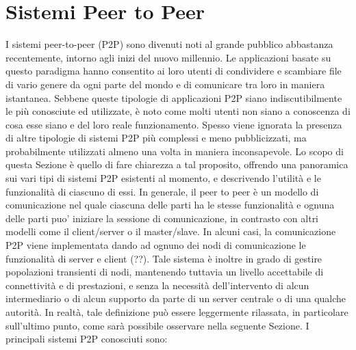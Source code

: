 \section{Sistemi Peer to Peer}
I sistemi peer-to-peer (P2P) sono divenuti noti al grande pubblico abbastanza recentemente, intorno agli inizi del nuovo millennio. Le applicazioni basate su questo paradigma hanno consentito ai loro utenti di condividere e scambiare file di vario genere da ogni parte del mondo e di comunicare tra loro in maniera istantanea.
Sebbene queste tipologie di applicazioni P2P siano indiscutibilmente le più conosciute ed utilizzate, è noto come molti utenti non siano a conoscenza di cosa esse siano e del loro reale funzionamento. Spesso viene ignorata la presenza di altre tipologie di sistemi P2P più complessi e meno pubblicizzati, ma probabilmente utilizzati almeno una volta in maniera inconsapevole. Lo scopo di questa Sezione è quello di fare chiarezza a tal proposito, offrendo una panoramica sui vari tipi di sistemi P2P esistenti al momento, e descrivendo l’utilità e le funzionalità di ciascuno di essi. In generale, il peer to peer è un modello di comunicazione nel quale ciascuna delle parti ha le stesse funzionalità e ognuna delle parti puo' iniziare la sessione di comunicazione, in contrasto con altri modelli come il client/server o il master/slave. In alcuni casi, la comunicazione P2P viene implementata dando ad ognuno dei nodi di comunicazione le funzionalità di server e client (??). Tale sistema è inoltre in grado di gestire popolazioni transienti di nodi, mantenendo tuttavia un livello accettabile di connettività e di prestazioni, e senza la necessità dell’intervento di alcun intermediario o di alcun supporto da parte di un server centrale o di una qualche autorità. In realtà, tale definizione può essere leggermente rilassata, in particolare sull’ultimo punto, come sarà possibile osservare nella seguente Sezione.
I principali sistemi P2P conosciuti sono:
